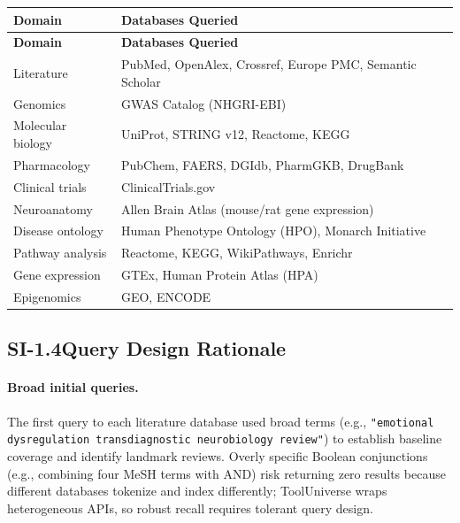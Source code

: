 {\small
\begin{longtable}{@{}p{3.2cm}p{10.2cm}@{}}
\toprule
\textbf{Domain} & \textbf{Databases Queried} \\
\midrule
\endfirsthead
\toprule
\textbf{Domain} & \textbf{Databases Queried} \\
\midrule
\endhead
\bottomrule
\endlastfoot
Literature &
  PubMed, OpenAlex, Crossref, Europe PMC, Semantic Scholar \\
\midrule
Genomics &
  GWAS Catalog (NHGRI-EBI) \\
\midrule
Molecular biology &
  UniProt, STRING v12, Reactome, KEGG \\
\midrule
Pharmacology &
  PubChem, FAERS, DGIdb, PharmGKB, DrugBank \\
\midrule
Clinical trials &
  ClinicalTrials.gov \\
\midrule
Neuroanatomy &
  Allen Brain Atlas (mouse/rat gene expression) \\
\midrule
Disease ontology &
  Human Phenotype Ontology (HPO), Monarch Initiative \\
\midrule
Pathway analysis &
  Reactome, KEGG, WikiPathways, Enrichr \\
\midrule
Gene expression &
  GTEx, Human Protein Atlas (HPA) \\
\midrule
Epigenomics &
  GEO, ENCODE \\
\end{longtable}
}

\subsection*{SI-1.4\quad Query Design Rationale}

\paragraph{Broad initial queries.}
The first query to each literature database used broad terms (e.g.,
\texttt{"emotional dysregulation transdiagnostic neurobiology review"}) to
establish baseline coverage and identify landmark reviews.  Overly specific
Boolean conjunctions (e.g., combining four MeSH terms with AND) risk
returning zero results because different databases tokenize and index
differently; ToolUniverse wraps heterogeneous APIs, so robust recall
requires tolerant query design.

